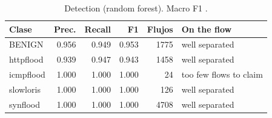 \begin{table}[t]
\centering
\small
\caption{Detection (random forest). Macro F1 \Fmacro.}
\label{tbl:deteccion}
\begin{tabular}{lrrrrp{2.6cm}}
\hline
Clase & Prec. & Recall & F1 & Flujos & On the flow \\
\hline
BENIGN & 0.956 & 0.949 & 0.953 & 1775 & well separated \\
httpflood & 0.939 & 0.947 & 0.943 & 1458 & well separated \\
icmpflood & 1.000 & 1.000 & 1.000 & 24 & too few flows to claim \\
slowloris & 1.000 & 1.000 & 1.000 & 126 & well separated \\
synflood & 1.000 & 1.000 & 1.000 & 4708 & well separated \\
\hline
\end{tabular}
\end{table}
